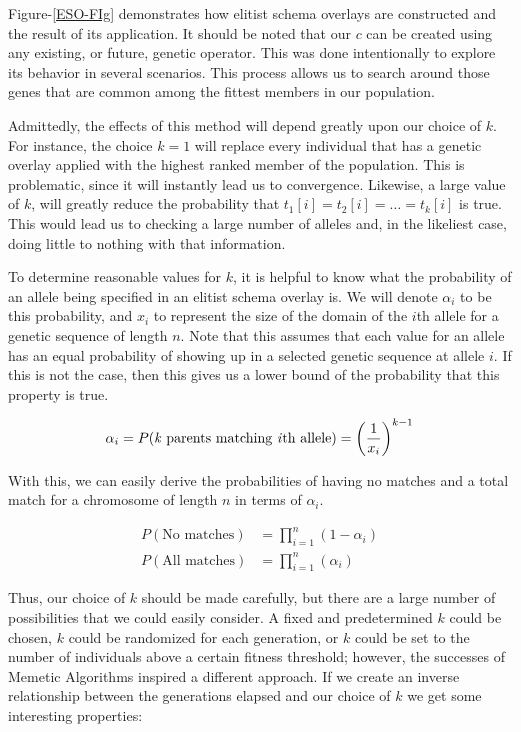 Figure-\ref{ESO-FIg} demonstrates how elitist schema overlays are constructed and the result of its application. It should be noted that our $c$ can be created using any existing, or future, genetic operator. This was done intentionally to explore its behavior in several scenarios. This process allows us to search around those genes that are common among the fittest members in our population. 

Admittedly, the effects of this method will depend greatly upon our choice of $k$. For instance, the choice $k = 1$ will replace every individual that has a genetic overlay applied with the highest ranked member of the population. This is problematic, since it will instantly lead us to convergence. Likewise, a large value of $k$, will greatly reduce the probability that $t_1[i] = t_2[i] = \ldots = t_k[i]$ is true. This would lead us to checking a large number of alleles and, in the likeliest case, doing little to nothing with that information.

To determine reasonable values for $k$, it is helpful to know what the probability of an allele being specified in an elitist schema overlay is. We will denote $\alpha_i$ to be this probability, and $x_i$ to represent the size of the domain of the $i$th allele for a genetic sequence of length $n$. Note that this assumes that each value for an allele has an equal probability of showing up in a selected genetic sequence at allele $i$. If this is not the case, then this gives us a lower bound of the probability that this property is true.

\[ \alpha_i = P(\text{\emph{k} parents matching \emph{i}th allele}) = \left(\frac{1}{x_i}\right)^{k-1} \]

With this, we can easily derive the probabilities of having no matches and a total match for a chromosome of length $n$ in terms of $\alpha_i$.

\begin{align*}
P( \text{No matches})&= \prod\limits_{i = 1}^n (1 - \alpha_i) \\
P( \text{All matches})&= \prod\limits_{i = 1}^n (\alpha_i)
\end{align*}

Thus, our choice of $k$ should be made carefully, but there are a large number of possibilities that we could easily consider. A fixed and predetermined $k$ could be chosen, $k$ could be randomized for each generation, or $k$ could be set to the number of individuals above a certain fitness threshold; however, the successes of Memetic Algorithms inspired a different approach. If we create an inverse relationship between the generations elapsed and our choice of $k$ we get some interesting properties:

